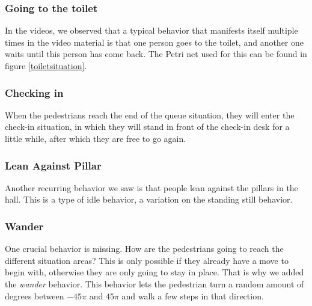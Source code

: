 \documentclass[11pt]{book}
\begin{document}
\subsubsection{Going to the toilet}
In the videos, we observed that a typical behavior that manifests itself multiple times in the video material is that one person goes to the toilet, and another one waits until this person has come back. The Petri net used for this can be found in figure \ref{toiletsituation}.



\subsubsection{Checking in}
When the pedestrians reach the end of the queue situation, they will enter the check-in situation, in which they will stand in front of the check-in desk for a little while, after which they are free to go again.

\subsubsection{Lean Against Pillar}
Another recurring behavior we saw is that people lean against the pillars in the hall. This is a type of idle behavior, a variation on the standing still behavior.

\subsubsection{Wander}
One crucial behavior is missing. How are the pedestrians going to reach the different situation areas? This is only possible if they already have a move to begin with, otherwise they are only going to stay in place. That is why we added the \emph{wander} behavior. This behavior lets the pedestrian turn a random amount of degrees between $-45\pi$ and $45\pi$ and walk a few steps in that direction.
\end{document}

